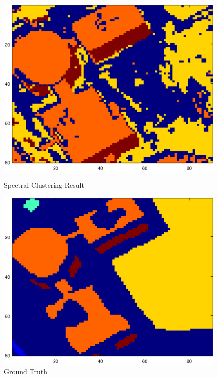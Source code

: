 \documentclass[12pt]{article}
\begin{document}
\begin{figure}
\begin{minipage}{.5\textwidth}
  \includegraphics[width=\linewidth]{./Images/paviaSub/myresult.eps}
  \caption{Spectral Clustering Result}
  \label{fig:PaviaSubResult}
\end{minipage}\hfill
\begin{minipage}{.5\textwidth}
  \includegraphics[width=\linewidth]{./Images/paviaSub/groundtruth.eps}
  \caption{Ground Truth}
  \label{fig:PaviaSubGroundTruth}
\end{minipage}
\end{figure}
\end{document}
